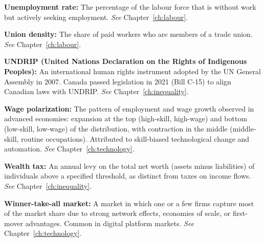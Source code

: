 \vspace{6pt}
\noindent\textbf{Unemployment rate:} The percentage of the labour force that is without work but actively seeking employment. \textit{See} Chapter~\ref{ch:labour}.

\vspace{6pt}
\noindent\textbf{Union density:} The share of paid workers who are members of a trade union. \textit{See} Chapter~\ref{ch:labour}.

\vspace{6pt}
\noindent\textbf{UNDRIP (United Nations Declaration on the Rights of Indigenous Peoples):} An international human rights instrument adopted by the UN General Assembly in 2007. Canada passed legislation in 2021 (Bill C-15) to align Canadian laws with UNDRIP. \textit{See} Chapter~\ref{ch:inequality}.

\vspace{6pt}
\noindent\textbf{Wage polarization:} The pattern of employment and wage growth observed in advanced economies: expansion at the top (high-skill, high-wage) and bottom (low-skill, low-wage) of the distribution, with contraction in the middle (middle-skill, routine occupations). Attributed to skill-biased technological change and automation. \textit{See} Chapter~\ref{ch:technology}.

\vspace{6pt}
\noindent\textbf{Wealth tax:} An annual levy on the total net worth (assets minus liabilities) of individuals above a specified threshold, as distinct from taxes on income flows. \textit{See} Chapter~\ref{ch:inequality}.

\vspace{6pt}
\noindent\textbf{Winner-take-all market:} A market in which one or a few firms capture most of the market share due to strong network effects, economies of scale, or first-mover advantages. Common in digital platform markets. \textit{See} Chapter~\ref{ch:technology}.
